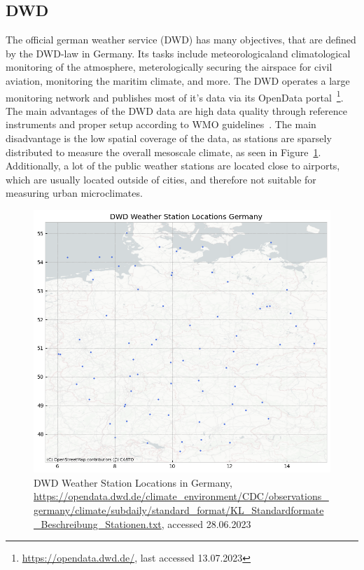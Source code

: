 \subsection{DWD}

The official german weather service (DWD) has many objectives, that are defined by the DWD-law in Germany. Its tasks include meteorologicaland climatological monitoring of the atmosphere, meterologically securing the airspace for civil aviation, monitoring the maritim climate, and more. The DWD operates a large monitoring network and publishes most of it's data via its OpenData portal~\footnote{\url{https://opendata.dwd.de/}, last accessed 13.07.2023}.\\
The main advantages of the DWD data are high data quality through reference instruments and proper setup according to WMO guidelines~\cite{wmo2018guide}. The main disadvantage is the low spatial coverage of the data, as stations are sparsely distributed to measure the overall mesoscale climate, as seen in Figure~\ref{fig:dwd sensor locations germany}. Additionally, a lot of the public weather stations are located close to airports, which are usually located outside of cities, and therefore not suitable for measuring urban microclimates.

\begin{figure}[ht]
    \centering
    \includegraphics[width=1\textwidth]{images/dwd_weather_station_locations_germany.png}
    \caption{DWD Weather Station Locations in Germany, \url{https://opendata.dwd.de/climate_environment/CDC/observations_germany/climate/subdaily/standard_format/KL_Standardformate_Beschreibung_Stationen.txt}, accessed 28.06.2023}
    \label{fig:dwd sensor locations germany}
\end{figure}

